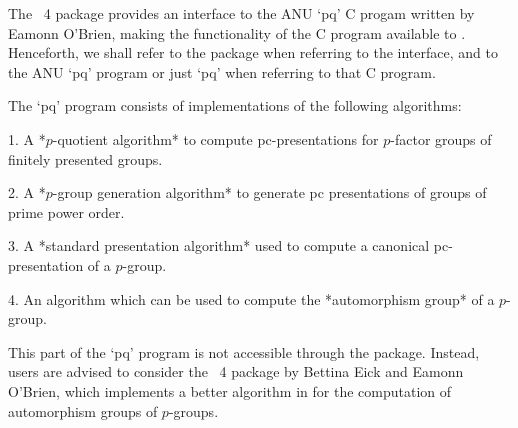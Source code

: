 

The {\GAP}~4 package {\ANUPQ} provides an interface to  the  ANU  `pq'  C
progam written by Eamonn O'Brien,  making  the  functionality  of  the  C
program available to {\GAP}. Henceforth, we shall refer to  the  {\ANUPQ}
package when referring to the {\GAP}  interface,  and  to  the  ANU  `pq'
program or just `pq' when referring to that C program.

The `pq' program consists of implementations of the following algorithms:

\beginlist%

\item{1.}
A *$p$-quotient algorithm* to  compute  pc-presentations  for  $p$-factor
groups of finitely presented groups.


\item{2.} 
A *$p$-group generation algorithm* to generate pc presentations of groups
of prime power order.


\item{3.}
A  *standard  presentation  algorithm*  used  to  compute   a   canonical
pc-presentation of a $p$-group.


\item{4.} 
An algorithm which can be used to compute the *automorphism group*  of  a
$p$-group.

\item{}
This part of the `pq' program is  not  accessible  through  the  {\ANUPQ}
package. Instead, users are advised  to  consider  the  {\GAP}~4  package
{\AutPGrp} by Bettina Eick and Eamonn O'Brien, which implements a  better
algorithm in  {\GAP}  for  the  computation  of  automorphism  groups  of
$p$-groups.

